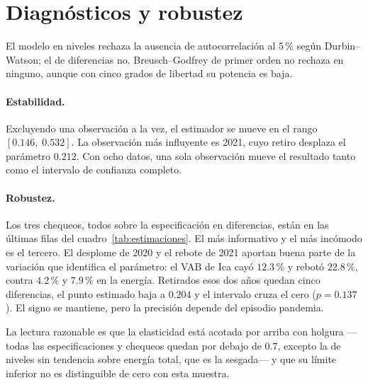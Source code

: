 \documentclass[11pt,a4paper]{article}
\begin{document}
\section{Diagnósticos y robustez}

\begin{table}[H]
\centering
\caption{Diagnósticos de los modelos sobre consumo por cliente. DW = Durbin--Watson, BG = Breusch--Godfrey de primer orden.}
\small

\label{tab:diagnosticos}
\end{table}

El modelo en niveles rechaza la ausencia de autocorrelación al 5\,\% según
Durbin--Watson; el de diferencias no. Breusch--Godfrey de primer orden no
rechaza en ninguno, aunque con cinco grados de libertad su potencia es baja.

\paragraph{Estabilidad.}
Excluyendo una observación a la vez, el estimador se mueve en el rango
$[0{.}146,\;0{.}532]$. La observación más influyente es 2021, cuyo retiro
desplaza el parámetro $0{.}212$. Con ocho datos, una sola observación mueve el
resultado tanto como el intervalo de confianza completo.

\paragraph{Robustez.}
Los tres chequeos, todos sobre la especificación en diferencias, están en las
últimas filas del cuadro~\ref{tab:estimaciones}. El más informativo y el más
incómodo es el tercero. El desplome de 2020 y el rebote de 2021 aportan buena
parte de la variación que identifica el parámetro: el VAB de Ica cayó
$12{.}3$\,\% y rebotó $22{.}8$\,\%, contra $4{.}2$\,\% y $7{.}9$\,\% en la
energía. Retirados esos dos años quedan cinco diferencias, el punto estimado
baja a $0{.}204$ y el intervalo cruza el cero ($p = 0{.}137$). El signo se
mantiene, pero la precisión depende del episodio pandemia.

La lectura razonable es que la elasticidad está acotada por arriba con holgura
---todas las especificaciones y chequeos quedan por debajo de $0{.}7$, excepto
la de niveles sin tendencia sobre energía total, que es la sesgada--- y que su
límite inferior no es distinguible de cero con esta muestra.
\end{document}
